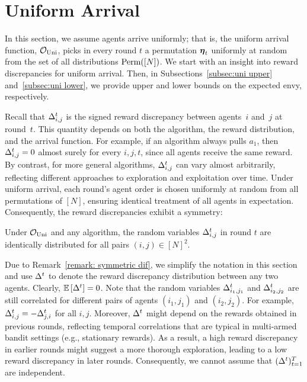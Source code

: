 \section{Uniform Arrival}
\label{sec:uniform}
In this section, we assume agents arrive uniformly; that is, the uniform arrival function, $\mathcal O_{\textnormal{Uni}}$, picks in every round $t$ a permutation $\boldsymbol{\eta}_t$ uniformly at random from the set of all distributions $\textnormal{Perm}([N])$. We start with an insight into reward discrepancies for uniform arrival. Then, in Subsections~\ref{subsec:uni upper} and~\ref{subsec:uni lower}, we provide upper and lower bounds on the expected envy, respectively. %


Recall that $\Delta^t_{i,j}$ is the signed reward discrepancy between agents~$i$ and~$j$ at round~$t$. This quantity depends on both the algorithm, the reward distribution, and the arrival function. 
For example, if an algorithm always pulls $a_1$, then $\Delta^t_{i,j} = 0$ almost surely for every $i,j,t$, since all agents receive the same reward. By contrast, for more general algorithms, $\Delta^t_{i,j}$ can vary almost arbitrarily, reflecting different approaches to exploration and exploitation over time. Under uniform arrival, each round's agent order is chosen uniformly at random from all permutations of $[N]$, ensuring identical treatment of all agents in expectation.  Consequently, the reward discrepancies exhibit a symmetry:
\begin{remark}\label{remark: symmetric dif}
Under $\mathcal O_{\textnormal{Uni}}$ and any algorithm, the random variables $\Delta^t_{i,j}$ in round $t$ are identically distributed for all pairs $(i,j)\in [N]^2$.
\end{remark}

Due to Remark~\ref{remark: symmetric dif}, we simplify the notation in this section and use $\Delta^t$ to denote the reward discrepancy distribution between any two agents. Clearly, $\mathbb{E}\left[ \Delta^t \right]=0$. Note that the random variables $\Delta^t_{i_1,j_1}$ and $\Delta^t_{i_2,j_2}$ are still correlated for different pairs of agents $(i_1,j_1)$ and $(i_2,j_2)$. For example, $\Delta^t_{i,j}= -\Delta^t_{j,i}$ for all $i,j$. 
Moreover, $\Delta^t$ might depend on the rewards obtained in previous rounds, reflecting temporal correlations that are typical in multi-armed bandit settings (e.g., stationary rewards).  As a result, a high reward discrepancy in earlier rounds might suggest a more thorough exploration, leading to a low reward discrepancy in later rounds. Consequently, we cannot assume that $(\Delta^t)_{t=1}^T$ are independent.

